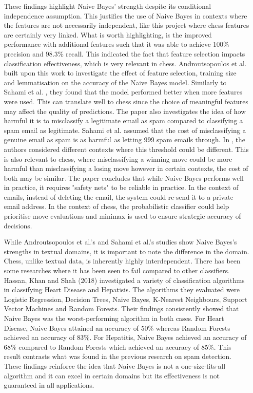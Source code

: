 These findings highlight Naive Bayes' strength despite its conditional independence assumption. This justifies the use of Naive Bayes in contexts where the features are not necessarily independent, like this project where chess features are certainly very linked. What is worth highlighting, is the improved performance with additional features such that it was able to achieve 100\% precision and 98.3\% recall. This indicated the fact that feature selection impacts classification effectiveness, which is very relevant in chess. Androutsopoulos et al. \cite{androutsopoulosEvaluationNaiveBayesian2000} built upon this work to investigate the effect of feature selection, training size and lemmatisation on the accuracy of the Naive Bayes model. Similarly to Sahami et al. \cite{sahamiBayesianApproachFiltering}, they found that the model performed better when more features were used. This can translate well to chess since the choice of meaningful features may affect the quality of predictions. The paper also investigates the idea of how harmful it is to misclassify a legitimate email as spam compared to classifying a spam email as legitimate. Sahami et al. assumed that the cost of misclassifying a genuine email as spam is as harmful as letting 999 spam emails through. In \cite{androutsopoulosEvaluationNaiveBayesian2000}, the authors considered different contexts where this threshold could be different. This is also relevant to chess, where misclassifying a winning move could be more harmful than misclassifying a losing move however in certain contexts, the cost of both may be similar. The paper concludes that while Naive Bayes performs well in practice, it requires "safety nets" to be reliable in practice. In the context of emails, instead of deleting the email, the system could re-send it to a private email address. In the context of chess, the probabilistic classifier could help prioritise move evaluations and minimax is used to ensure strategic accuracy of decisions. 

While Androutsopoulos et al.'s and Sahami et al.'s studies show Naive Bayes's strengths in textual domains, it is important to note the difference in the domain. Chess, unlike textual data, is inherently highly interdependent. There has been some researches where it has been seen to fail compared to other classifiers. Hassan, Khan and Shah (2018) \cite{ulhassanComparisonMachineLearning2018} investigated a variety of classification algorithms in classifying Heart Disease and Hepatisis. The algorithms they evaluated were Logistic Regression, Decision Trees, Naive Bayes, K-Nearest Neighbours, Support Vector Machines and Random Forests. Their findings consistently showed that Naive Bayes was the worst-performing algorithm in both cases. For Heart Disease, Naive Bayes attained an accuracy of 50\% whereas Random Forests achieved an accuracy of 83\%. For Hepatitis, Naive Bayes achieved an accuracy of 68\% compared to Random Forests which achieved an accuracy of 85\%. This result contrasts what was found in the previous research on spam detection. These findings reinforce the idea that Naive Bayes is not a one-size-fits-all algorithm and it can excel in certain domains but its effectiveness is not guaranteed in all applications. 

